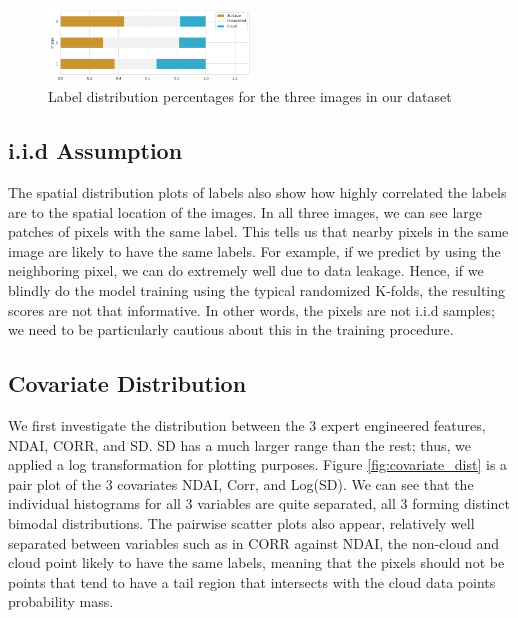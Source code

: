 \documentclass[11pt, letterpaper, journal]{IEEEtran}
\begin{document}
\begin{figure}[!h]
\centering
\includegraphics[width=0.48\textwidth]{statics/2.a.png}
\caption{Label distribution percentages for the three images in our dataset}
\label{fig:label_dist}
\end{figure}

\subsection{i.i.d Assumption}
The spatial distribution plots of labels also show how highly correlated the labels are to the spatial location of the images. In all three images, we can see large patches of pixels with the same label. This tells us that nearby pixels in the same image are likely to have the same labels. For example, if we predict by using the neighboring pixel, we can do extremely well due to data leakage. Hence, if we blindly do the model training using the typical randomized K-folds, the resulting scores are not that informative. In other words, the pixels are not i.i.d samples; we need to be particularly cautious about this in the training procedure.

\subsection{Covariate Distribution}
We first investigate the distribution between the 3 expert engineered features, NDAI, CORR, and SD. SD has a much larger range than the rest; thus, we applied a log transformation for plotting purposes. Figure \ref{fig:covariate_dist} is a pair plot of the 3 covariates NDAI, Corr, and Log(SD). We can see that the individual histograms for all 3 variables are quite separated, all 3 forming distinct bimodal distributions. The pairwise scatter plots also appear, relatively well separated between variables such as in CORR against NDAI, the non-cloud and cloud point likely to have the same labels, meaning that the pixels should not be points that tend to have a tail region that intersects with the cloud data points probability mass.
\end{document}

